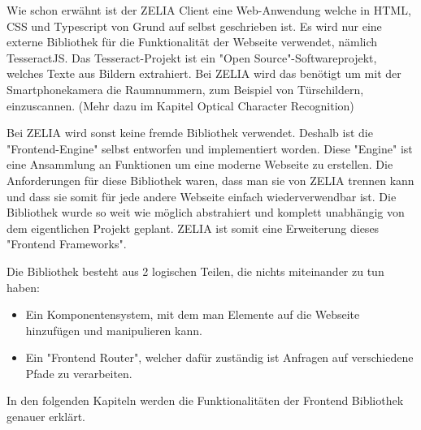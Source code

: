 
Wie schon erwähnt ist der ZELIA Client eine Web-Anwendung welche in HTML, CSS und Typescript von Grund auf selbst geschrieben ist. Es wird nur eine externe Bibliothek für die Funktionalität der Webseite verwendet, nämlich TesseractJS. Das Tesseract-Projekt ist ein "Open Source"-Softwareprojekt, welches Texte aus Bildern extrahiert. Bei ZELIA wird das benötigt um mit der Smartphonekamera die Raumnummern, zum Beispiel von Türschildern, einzuscannen. (Mehr dazu im Kapitel Optical Character Recognition)

Bei ZELIA wird sonst keine fremde Bibliothek verwendet. Deshalb ist die "Frontend-Engine" selbst entworfen und implementiert worden. Diese "Engine" ist eine Ansammlung an Funktionen um eine moderne Webseite zu erstellen. Die Anforderungen für diese Bibliothek waren, dass man sie von ZELIA trennen kann und dass sie somit für jede andere Webseite einfach wiederverwendbar ist. Die Bibliothek wurde so weit wie möglich abstrahiert und komplett unabhängig von dem eigentlichen Projekt geplant. ZELIA ist somit eine Erweiterung dieses "Frontend Frameworks".

Die Bibliothek besteht aus 2 logischen Teilen, die nichts miteinander zu tun haben:
\begin{itemize}
    \item Ein Komponentensystem, mit dem man Elemente auf die Webseite hinzufügen und manipulieren kann. 
    \item Ein "Frontend Router", welcher dafür zuständig ist Anfragen auf verschiedene Pfade zu verarbeiten.
\end{itemize}

In den folgenden Kapiteln werden die Funktionalitäten der Frontend Bibliothek genauer erklärt.